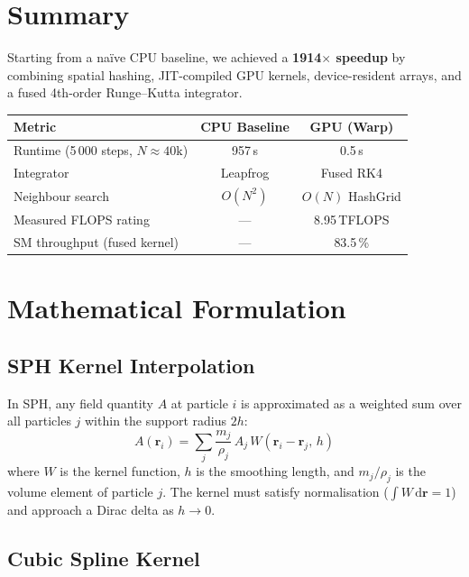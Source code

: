 \documentclass[11pt,a4paper]{article}
\begin{document}
\section{Summary}

Starting from a naïve CPU baseline, we achieved a \textbf{1914$\times$ speedup}
by combining spatial hashing, JIT-compiled GPU kernels, device-resident arrays,
and a fused 4th-order Runge–Kutta integrator.

\vspace{4pt}
\begin{center}
\begin{tabular}{lcc}
  \toprule
  \textbf{Metric} & \textbf{CPU Baseline} & \textbf{GPU (Warp)} \\
  \midrule
  Runtime (5\,000 steps, $N{\approx}40\text{k}$) & 957\,s & 0.5\,s \\
  Integrator & Leapfrog & Fused RK4 \\
  Neighbour search & $O(N^2)$ & $O(N)$ HashGrid \\
  Measured FLOPS rating & — & 8.95\,TFLOPS \\
  SM throughput (fused kernel) & — & 83.5\,\% \\
  \bottomrule
\end{tabular}
\end{center}

\section{Mathematical Formulation}

\subsection{SPH Kernel Interpolation}

In SPH, any field quantity $A$ at particle $i$ is approximated as a weighted sum over all
particles $j$ within the support radius $2h$:
\[
  A(\mathbf{r}_i) = \sum_j \frac{m_j}{\rho_j}\,A_j\,W(\mathbf{r}_i - \mathbf{r}_j,\,h)
\]
where $W$ is the kernel function, $h$ is the smoothing length, and $m_j/\rho_j$ is the volume
element of particle $j$.  The kernel must satisfy normalisation ($\int W\,\mathrm{d}\mathbf{r}=1$)
and approach a Dirac delta as $h\to 0$.

\subsection{Cubic Spline Kernel}
\end{document}
